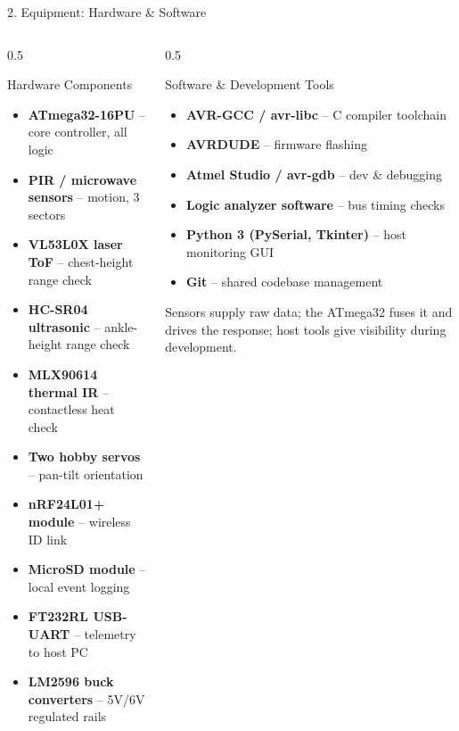 \documentclass[aspectratio=169, 10pt]{beamer}
\begin{document}
\begin{frame}{2. Equipment: Hardware \& Software}
    \begin{columns}[T]
        \begin{column}{0.5\textwidth}
            \begin{block}{Hardware Components}
                \footnotesize
                \begin{itemize}
                    \item \textbf{ATmega32-16PU} -- core controller, all logic
                    \item \textbf{PIR / microwave sensors} -- motion, 3 sectors
                    \item \textbf{VL53L0X laser ToF} -- chest-height range check
                    \item \textbf{HC-SR04 ultrasonic} -- ankle-height range check
                    \item \textbf{MLX90614 thermal IR} -- contactless heat check
                    \item \textbf{Two hobby servos} -- pan-tilt orientation
                    \item \textbf{nRF24L01+ module} -- wireless ID link
                    \item \textbf{MicroSD module} -- local event logging
                    \item \textbf{FT232RL USB-UART} -- telemetry to host PC
                    \item \textbf{LM2596 buck converters} -- 5V/6V regulated rails
                \end{itemize}
            \end{block}
        \end{column}
        \begin{column}{0.5\textwidth}
            \begin{block}{Software \& Development Tools}
                \footnotesize
                \begin{itemize}
                    \item \textbf{AVR-GCC / avr-libc} -- C compiler toolchain
                    \item \textbf{AVRDUDE} -- firmware flashing
                    \item \textbf{Atmel Studio / avr-gdb} -- dev \& debugging
                    \item \textbf{Logic analyzer software} -- bus timing checks
                    \item \textbf{Python 3 (PySerial, Tkinter)} -- host monitoring GUI
                    \item \textbf{Git} -- shared codebase management
                \end{itemize}
            \end{block}
            \vspace{0.15cm}
            \footnotesize \color{TextDim} Sensors supply raw data; the ATmega32 fuses it and drives the response; host tools give visibility during development.
        \end{column}
    \end{columns}
\end{frame}
\end{document}
